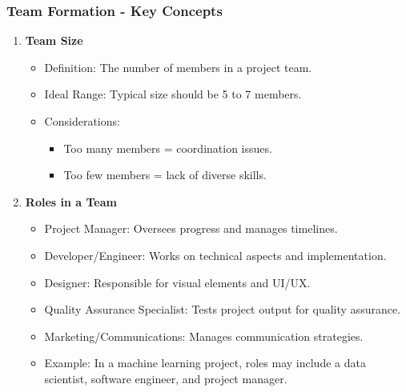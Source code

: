 \documentclass{beamer}
\begin{document}
\begin{frame}[fragile]
    \frametitle{Team Formation - Key Concepts}
    \begin{enumerate}
        \item \textbf{Team Size}
        \begin{itemize}
            \item Definition: The number of members in a project team.
            \item Ideal Range: Typical size should be 5 to 7 members.
            \item Considerations:
            \begin{itemize}
                \item Too many members = coordination issues.
                \item Too few members = lack of diverse skills.
            \end{itemize}
        \end{itemize}

        \item \textbf{Roles in a Team}
        \begin{itemize}
            \item Project Manager: Oversees progress and manages timelines.
            \item Developer/Engineer: Works on technical aspects and implementation.
            \item Designer: Responsible for visual elements and UI/UX.
            \item Quality Assurance Specialist: Tests project output for quality assurance.
            \item Marketing/Communications: Manages communication strategies.
            \item Example: In a machine learning project, roles may include a data scientist, software engineer, and project manager.
        \end{itemize}
    \end{enumerate}
\end{frame}
\end{document}
